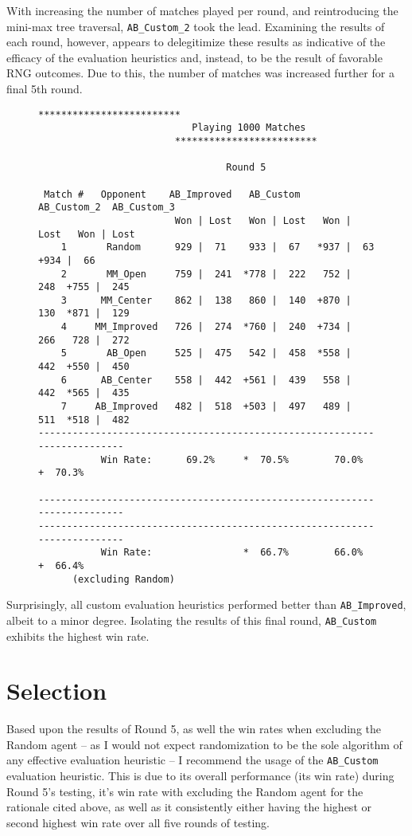 \documentclass[12pt]{article}
\newcommand{\code}[2][python]{\texttt{#2}}
\begin{document}
With increasing the number of matches played per round, and reintroducing
the mini-max tree traversal, \code{AB_Custom_2} took the lead. Examining
the results of each round, however, appears to delegitimize these results as
indicative of the efficacy of the evaluation heuristics and, instead, to 
be the result of favorable RNG outcomes. Due to this, the number of matches was
increased further for a final 5th round.

\begin{figure}[H]
\begin{Verbatim}[fontsize=\footnotesize]
                        *************************                         
                           Playing 1000 Matches                              
                        *************************                         

                                 Round 5

 Match #   Opponent    AB_Improved   AB_Custom   AB_Custom_2  AB_Custom_3 
                        Won | Lost   Won | Lost   Won | Lost   Won | Lost 
    1       Random      929 |  71    933 |  67   *937 |  63   +934 |  66  
    2       MM_Open     759 |  241  *778 |  222   752 |  248  +755 |  245 
    3      MM_Center    862 |  138   860 |  140  +870 |  130  *871 |  129 
    4     MM_Improved   726 |  274  *760 |  240  +734 |  266   728 |  272 
    5       AB_Open     525 |  475   542 |  458  *558 |  442  +550 |  450 
    6      AB_Center    558 |  442  +561 |  439   558 |  442  *565 |  435 
    7     AB_Improved   482 |  518  +503 |  497   489 |  511  *518 |  482 
--------------------------------------------------------------------------
           Win Rate:      69.2%     *  70.5%        70.0%     +  70.3%    

--------------------------------------------------------------------------
--------------------------------------------------------------------------
           Win Rate:                *  66.7%        66.0%     +  66.4%
      (excluding Random)
\end{Verbatim}
\end{figure}

Surprisingly, all custom evaluation heuristics performed better than
\code{AB_Improved}, albeit to a minor degree. Isolating the results of this
final round, \code{AB_Custom} exhibits the highest win rate. 
\section*{Selection}
Based upon the results of Round 5, as well the win rates when excluding the 
Random agent -- as I would not expect randomization to be the sole algorithm of
any effective evaluation heuristic -- I recommend the usage of the 
\code{AB_Custom} evaluation heuristic. This is due to its overall performance
(its win rate) during Round 5's testing, it's win rate with excluding the
Random agent for the rationale cited above, as well as it consistently either
having the highest or second highest win rate over all five rounds of testing.
\end{document}
